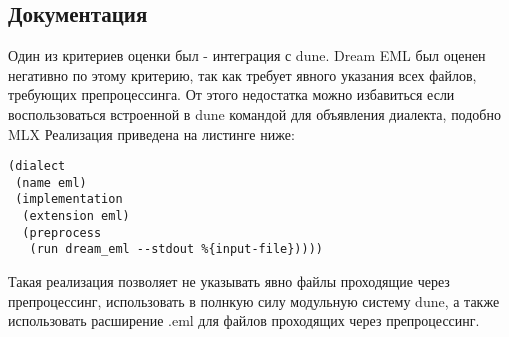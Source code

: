 \subsection{Документация}

Один из критериев оценки был - интеграция с dune.
Dream EML был оценен негативно по этому критерию, так как требует явного указания всех файлов, требующих препроцессинга.
От этого недостатка можно избавиться если воспользоваться встроенной в dune командой для объявления диалекта, подобно MLX %
Реализация приведена на листинге ниже:

\begin{lstlisting}
(dialect
 (name eml)
 (implementation
  (extension eml)
  (preprocess
   (run dream_eml --stdout %{input-file}))))
\end{lstlisting}

Такая реализация позволяет не указывать явно файлы проходящие через препроцессинг, использовать в полнкую силу модульную систему dune, а также использовать расширение .eml для файлов проходящих через препроцессинг.
